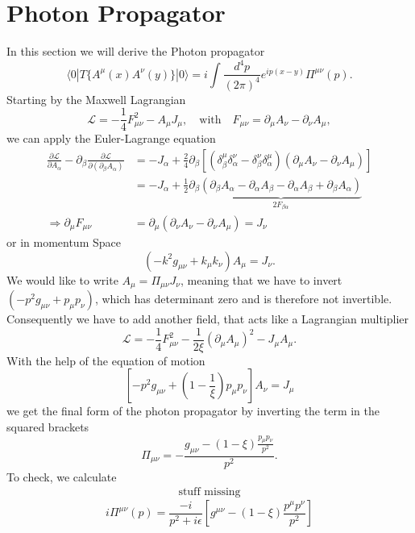 \section{Photon Propagator}\label{sec:photonPropagator}
In this section we will derive the Photon propagator
\begin{equation}
	\langle 0 | T\{ A^\mu (x) A^\nu (y) \} | 0 \rangle = i \int \frac{d^4 p}{(2 \pi)^4} e^{ip(x-y)} \Pi^{\mu\nu}(p).
\end{equation}
Starting by the Maxwell Lagrangian
\begin{equation}
	\mathcal{L} = - \frac{1}{4} F_{\mu\nu}^2 - A_\mu J_\mu, \quad \text{with} \quad F_{\mu\nu} = \partial_\mu A_\nu - \partial_\nu A_\mu,
\end{equation}
we can apply the Euler-Lagrange equation
\begin{align}
	\frac{\partial \mathcal{L}}{\partial A_\alpha} - \partial_\beta \frac{\partial \mathcal{L}}{\partial(\partial_\beta A_\alpha)} &= -J_\alpha + \frac{2}{4} \partial_\beta [(\delta_\beta^\mu \delta_\alpha^\nu - \delta_\beta^\nu \delta_\alpha^\mu) (\partial_\mu A_\nu - \partial_\nu A_\mu) ] \\
	&= -J_\alpha + \frac{1}{2} \partial_\beta \underbrace{(\partial_\beta A_\alpha - \partial_\alpha A_\beta - \partial_\alpha A_\beta + \partial_\beta A_\alpha)}_{2F_{\beta\alpha}} \\
	\Rightarrow \partial_\mu F_{\mu\nu} &= \partial_\mu(\partial_\nu A_\nu - \partial_\nu A_\mu) =  J_\nu
\end{align}
or in momentum Space
\begin{equation}
	(-k^2 g_{\mu\nu} + k_\mu k_\nu) A_\mu = J_\nu.
\end{equation}
We would like to write $A_\mu = \Pi_{\mu\nu} J_\nu$, meaning that we have to invert $(-p^2 g_{\mu\nu} + p_\mu p_\nu)$, which has determinant zero and is therefore not invertible. Consequently we have to add another field, that acts like a Lagrangian multiplier 
\begin{equation}
	\mathcal{L} = - \frac{1}{4} F_{\mu\nu}^2 - \frac{1}{2 \xi} (\partial_\mu A_\mu)^2 - J_\mu A_\mu.
\end{equation}
With the help of the equation of motion
\begin{equation}
	\left[ -p^2 g_{\mu\nu} + \left(1 - \frac{1}{\xi} \right) p_\mu p_\nu \right] A_\nu = J_\mu 
\end{equation}
we get the final form of the photon propagator by inverting the term in the squared brackets
\begin{equation}
	\Pi_{\mu\nu} = - \frac{g_{\mu\nu} -(1-\xi) \frac{p_\mu p_\nu}{p^2}}{p^2}.
\end{equation}
To check, we calculate
\begin{align}
	\text{stuff missing}
\end{align}
\begin{equation}
	i \Pi^{\mu\nu} (p) = \frac{-i}{p^2 + i \epsilon} \left[ g^{\mu\nu} - (1 - \xi) \frac{p^\mu p^\nu}{p^2} \right]
\end{equation}

